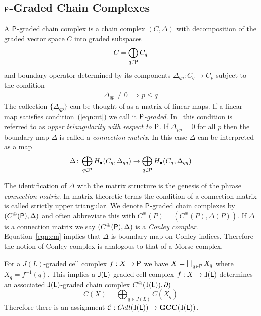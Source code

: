 %
%


\subsection{${\mathsf P}$-Graded Chain Complexes}


A ${\mathsf P}$-graded chain complex is a chain complex $(C,\Delta)$ with decomposition of the graded vector space $C$ into graded subspaces $$C=\bigoplus_{q\in {\mathsf P}} C_q$$ and boundary operator determined by its components $\Delta_{qp}:C_q\to C_p$ subject to the condition 
\begin{align}\label{eqn:ut}
\Delta_{qp}\neq 0\implies p\leq q
\end{align}  The collection $\{\Delta_{qp}\}$ can be thought of as a matrix of linear maps. If a linear map satisfies condition~(\ref{eqn:ut}) we call it {\em ${\mathsf P}$-graded}.  In~\cite{fran} this condition is referred to as {\em upper triangularity with respect to ${\mathsf P}$}.   If $\Delta_{pp} = 0$ for all $p$ then the boundary map $\Delta$ is called a {\em connection matrix}.  In this case $\Delta$ can be interpreted as a map
\begin{align}\label{eqn:cm}
\Delta \colon \bigoplus_{q\in {\mathsf P}} H_\bullet(C_q,\Delta_{qq})\to \bigoplus_{q\in {\mathsf P}} H_\bullet(C_q,\Delta_{qq})
\end{align}

The identification of $\Delta$ with the matrix structure is the genesis of the phrase {\em connection matrix}.  In matrix-theoretic terms the condition of a connection matrix is called strictly upper triangular.  We denote ${\mathsf P}$-graded chain complexes by $(C^\oplus({\mathsf P}),\Delta)$ and often abbreviate this with $C^\oplus(P)=(C^\oplus(P),\Delta(P))$.  If  $\Delta$ is a connection matrix we say $(C^\oplus({\mathsf P}),\Delta)$ is a {\em Conley complex}.  Equation~\ref{eqn:cm} implies that $\Delta$ is boundary map on Conley indices.  Therefore the notion of Conley complex is analogous to that of a Morse complex.


\begin{ex}
For a $J(L)$-graded cell complex $f:X\to {\mathsf P}$ we have $X=\bigsqcup_{q\in {\mathsf P}} X_q$ where $X_q=f^{-1}(q)$.   This implies a ${\mathsf J}({\mathsf L})$-graded cell complex $f:X\to {\mathsf J}({\mathsf L})$ determines an associated ${\mathsf J}({\mathsf L})$-graded chain complex $C^\oplus({\mathsf J}({\mathsf L})),\partial)$ 
\[
C(X) = \bigoplus_{q\in J(L)} C(X_q)
\]
Therefore there is an assignment ${\mathcal C}:Cell({\mathsf J}({\mathsf L}))\to {\bf GCC}({\mathsf J}({\mathsf L}))$. 
\end{ex}

